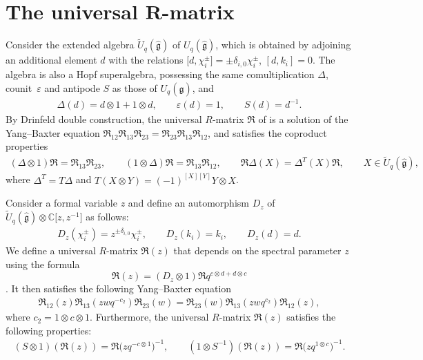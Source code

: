 \documentclass[pdftex]{sigma}
\numberwithin{equation}{section}
\begin{document}
\section[The universal R-matrix]{The universal $\boldsymbol{R}$-matrix}\label{sec3}

Consider the extended algebra $\widetilde{U}_q(\mathfrak{\hat{g}})$ of $U_q(\mathfrak{\hat{g}})$, which is obtained by adjoining an additional element $d$ with the relations
$ \bigl[d, \chi_i^{\pm}\bigr]=\pm \delta_{i,0}\chi_i^{\pm}$, $ [d, k_i]=0$.
The algebra  is also a Hopf superalgebra, possessing the same comultiplication
$\Delta$, counit~$\varepsilon$ and antipode $S$ as those of $U_q(\mathfrak{\hat{g}})$, and
\begin{gather*}
 \Delta(d)=d\otimes1+1\otimes d,\qquad \varepsilon(d)=1,\qquad S(d)=d^{-1}.
\end{gather*}
By Drinfeld double construction, the universal $R$-matrix $\mathfrak{R}$ of  is a solution of the Yang--Baxter equation
$\mathfrak{R}_{12}\mathfrak{R}_{13}\mathfrak{R}_{23}=\mathfrak{R}_{23}\mathfrak{R}_{13}\mathfrak{R}_{12}$,
and satisfies the coproduct properties
\begin{gather*}
 (\Delta\otimes 1)\mathfrak{R}=\mathfrak{R}_{13}\mathfrak{R}_{23},\qquad (1\otimes \Delta)\mathfrak{R}=\mathfrak{R}_{13}\mathfrak{R}_{12}, \qquad
 \mathfrak{R}\Delta(X)=\Delta^T(X)\mathfrak{R}, \qquad X\in\widetilde{U}_q(\mathfrak{\hat{g}}),
\end{gather*}
where $\Delta^T=T\Delta$ and $T(X\otimes Y)=(-1)^{[X][Y]}Y\otimes X$.


Consider a formal variable $z$ and define an automorphism $D_z$ of $\widetilde{U}_q(\mathfrak{\hat{g}})\otimes\mathbb{C}\bigl[z, z^{-1}\bigr]$ as follows:
\begin{gather}\label{Dz}
 D_z(\chi_i^{\pm})=z^{\pm\delta_{i,0}}\chi_i^{\pm}, \qquad D_z(k_i)=k_i, \qquad D_z(d)=d.
\end{gather}
We define a universal $R$-matrix $\mathfrak{R}(z)$ that depends on the spectral parameter $z$ using the formula~\[
\mathfrak{R}(z)=(D_z\otimes1)\mathfrak{R}q^{c\otimes d+d\otimes c}\].
It then satisfies the following Yang--Baxter equation
\begin{gather}\label{oper0}
 \mathfrak{R}_{12}(z)\mathfrak{R}_{13}(zwq^{-c_2})\mathfrak{R}_{23}(w)=\mathfrak{R}_{23}(w)\mathfrak{R}_{13}(zwq^{c_2})\mathfrak{R}_{12}(z),
\end{gather}where $c_2=1\otimes c\otimes1$.
Furthermore, the universal $R$-matrix $\mathfrak{R}(z)$ satisfies the following properties:
\begin{gather*}%
 (S\otimes1)(\mathfrak{R}(z))=\mathfrak{R}\bigl(zq^{-c\otimes1}\bigr)^{-1},\qquad (1\otimes S^{-1})(\mathfrak{R}(z))=\mathfrak{R}\bigl(zq^{1\otimes c}\bigr)^{-1}.
\end{gather*}
\end{document}
